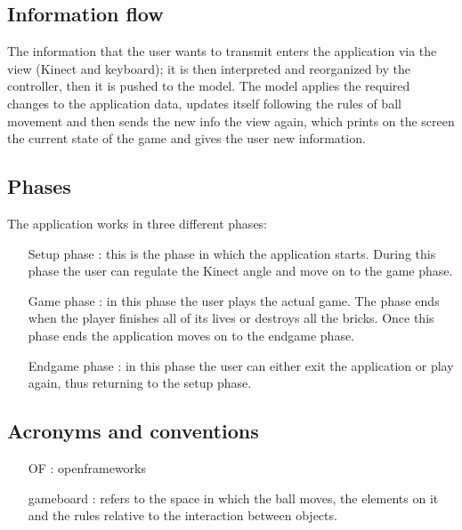 \documentclass[]{article}
\begin{document}
\subsection{Information flow}
The information that the user wants to transmit enters the application via the view (Kinect and keyboard); it is then interpreted and reorganized by the controller, then it is pushed to the model. The model applies the required changes to the application data, updates itself following the rules of ball movement and then sends the new info the view again, which prints on the screen the current state of the game and gives the user new information.\\
\subsection{Phases}
The application works in three different phases:
\begin{itemize}
	\item [Setup phase] : this is the phase in which the application starts. During this phase the user can regulate the Kinect angle and move on to the game phase.
	\item  [Game phase] : in this phase the user plays the actual game. The phase ends when the player finishes all of its lives or destroys all the bricks. Once this phase ends the application moves on to the endgame phase.
	\item [Endgame phase] : in this phase the user can either exit the application or play again, thus returning to the setup phase. 
\end{itemize}
\subsection{Acronyms and conventions}
\begin{itemize}
	\item [OF] : openframeworks
	\item [gameboard] : refers to the space in which the ball moves, the elements on it and the rules relative to the interaction between objects.
\end{itemize}
\newpage
\end{document}
